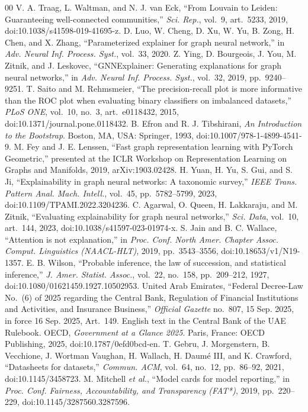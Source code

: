 \documentclass[conference]{IEEEtran}
\begin{document}
\begin{thebibliography}{00}
 V. A. Traag, L. Waltman, and N. J. van Eck, ``From Louvain to Leiden: Guaranteeing well-connected communities,'' \emph{Sci. Rep.}, vol.~9, art.~5233, 2019, doi:10.1038/s41598-019-41695-z.
 D. Luo, W. Cheng, D. Xu, W. Yu, B. Zong, H. Chen, and X. Zhang, ``Parameterized explainer for graph neural network,'' in \emph{Adv. Neural Inf. Process. Syst.}, vol.~33, 2020.
 Z. Ying, D. Bourgeois, J. You, M. Zitnik, and J. Leskovec, ``GNNExplainer: Generating explanations for graph neural networks,'' in \emph{Adv. Neural Inf. Process. Syst.}, vol.~32, 2019, pp.~9240--9251.
 T. Saito and M. Rehmsmeier, ``The precision-recall plot is more informative than the ROC plot when evaluating binary classifiers on imbalanced datasets,'' \emph{PLoS ONE}, vol.~10, no.~3, art.~e0118432, 2015, doi:10.1371/journal.pone.0118432.
 B. Efron and R. J. Tibshirani, \emph{An Introduction to the Bootstrap}. Boston, MA, USA: Springer, 1993, doi:10.1007/978-1-4899-4541-9.
 M. Fey and J. E. Lenssen, ``Fast graph representation learning with PyTorch Geometric,'' presented at the ICLR Workshop on Representation Learning on Graphs and Manifolds, 2019, arXiv:1903.02428.
 H. Yuan, H. Yu, S. Gui, and S. Ji, ``Explainability in graph neural networks: A taxonomic survey,'' \emph{IEEE Trans. Pattern Anal. Mach. Intell.}, vol.~45, pp.~5782--5799, 2023, doi:10.1109/TPAMI.2022.3204236.
 C. Agarwal, O. Queen, H. Lakkaraju, and M. Zitnik, ``Evaluating explainability for graph neural networks,'' \emph{Sci. Data}, vol.~10, art.~144, 2023, doi:10.1038/s41597-023-01974-x.
 S. Jain and B. C. Wallace, ``Attention is not explanation,'' in \emph{Proc. Conf. North Amer. Chapter Assoc. Comput. Linguistics (NAACL-HLT)}, 2019, pp.~3543--3556, doi:10.18653/v1/N19-1357.
 E. B. Wilson, ``Probable inference, the law of succession, and statistical inference,'' \emph{J. Amer. Statist. Assoc.}, vol.~22, no.~158, pp.~209--212, 1927, doi:10.1080/01621459.1927.10502953.
 United Arab Emirates, ``Federal Decree-Law No.~(6) of 2025 regarding the Central Bank, Regulation of Financial Institutions and Activities, and Insurance Business,'' \emph{Official Gazette} no.~807, 15 Sep. 2025, in force 16 Sep. 2025, Art.~149. English text in the Central Bank of the UAE Rulebook.
 OECD, \emph{Government at a Glance 2025}. Paris, France: OECD Publishing, 2025, doi:10.1787/0efd0bcd-en.
 T. Gebru, J. Morgenstern, B. Vecchione, J. Wortman Vaughan, H. Wallach, H. Daum\'e III, and K. Crawford, ``Datasheets for datasets,'' \emph{Commun. ACM}, vol.~64, no.~12, pp.~86--92, 2021, doi:10.1145/3458723.
 M. Mitchell \emph{et al.}, ``Model cards for model reporting,'' in \emph{Proc. Conf. Fairness, Accountability, and Transparency (FAT*)}, 2019, pp.~220--229, doi:10.1145/3287560.3287596.
\end{thebibliography}
\end{document}
